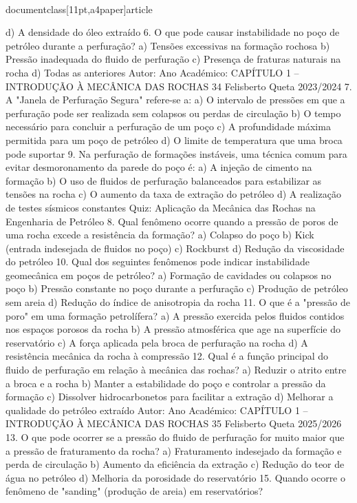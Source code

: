 \\documentclass[11pt,a4paper]{article}
\begin{document}
d) A densidade do óleo extraído
6. O que pode causar instabilidade no poço de petróleo durante a perfuração?
a) Tensões excessivas na formação rochosa
b) Pressão inadequada do fluido de perfuração
c) Presença de fraturas naturais na rocha
d) Todas as anteriores
Autor:
Ano Académico:
CAPÍTULO 1 – INTRODUÇÃO À MECÂNICA DAS ROCHAS 34
Felisberto Queta
2023/2024
7. A "Janela de Perfuração Segura" refere-se a:
a) O intervalo de pressões em que a perfuração pode ser realizada sem colapsos ou perdas de circulação
b) O tempo necessário para concluir a perfuração de um poço
c) A profundidade máxima permitida para um poço de petróleo
d) O limite de temperatura que uma broca pode suportar
9. Na perfuração de formações instáveis, uma técnica comum para evitar desmoronamento da parede do poço é:
a) A injeção de cimento na formação
b) O uso de fluidos de perfuração balanceados para estabilizar as tensões na rocha
c) O aumento da taxa de extração do petróleo
d) A realização de testes sísmicos constantes
Quiz: Aplicação da 
Mecânica das 
Rochas na 
Engenharia de 
Petróleo
8. Qual fenômeno ocorre quando a pressão de poros de uma rocha excede a resistência da formação?
a) Colapso do poço
b) Kick (entrada indesejada de fluidos no poço)
c) Rockburst
d) Redução da viscosidade do petróleo
10. Qual dos seguintes fenômenos pode indicar instabilidade geomecânica em poços de petróleo?
a) Formação de cavidades ou colapsos no poço
b) Pressão constante no poço durante a perfuração
c) Produção de petróleo sem areia
d) Redução do índice de anisotropia da rocha
11. O que é a "pressão de poro" em uma formação petrolífera?
a) A pressão exercida pelos fluidos contidos nos espaços porosos da rocha
b) A pressão atmosférica que age na superfície do reservatório
c) A força aplicada pela broca de perfuração na rocha
d) A resistência mecânica da rocha à compressão
12. Qual é a função principal do fluido de perfuração em relação à mecânica das rochas?
a) Reduzir o atrito entre a broca e a rocha
b) Manter a estabilidade do poço e controlar a pressão da formação
c) Dissolver hidrocarbonetos para facilitar a extração
d) Melhorar a qualidade do petróleo extraído
Autor:
Ano Académico:
CAPÍTULO 1 – INTRODUÇÃO À MECÂNICA DAS ROCHAS 35
Felisberto Queta
2025/2026
13. O que pode ocorrer se a pressão do fluido de perfuração for muito maior que a pressão de fraturamento da 
rocha?
a) Fraturamento indesejado da formação e perda de circulação
b) Aumento da eficiência da extração
c) Redução do teor de água no petróleo
d) Melhoria da porosidade do reservatório
15. Quando ocorre o fenômeno de "sanding" (produção de areia) em reservatórios?
\end{document}
